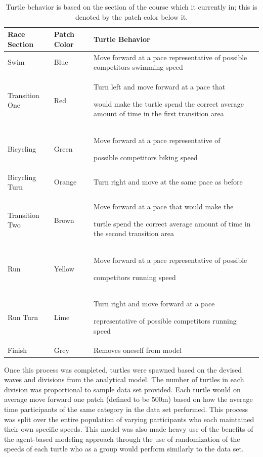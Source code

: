 \documentclass[12pt]{article}
\begin{document}
\begin{table}[H]
\centering

\label{tab:colors}
\begin{tabular}{|p{2.5cm}|p{2.5cm}|p{10cm}|}
\hline
\textbf{Race Section} & \textbf{Patch Color} & \textbf{Turtle Behavior}\\ \hline
Swim         & Blue         & Move forward at a pace representative of possible competitors swimming speed\\ \hline
Transition One    & Red         & Turn left and move forward at a pace that\par would make the turtle spend the correct average amount of time in the first transition area \\ \hline
Bicycling       & Green      & Move forward at a pace representative of \par possible competitors biking speed\\ \hline
Bicycling Turn    & Orange        & Turn right and move at the same pace as before\\ \hline
Transition Two    & Brown        & Move forward at a pace that would make the\par turtle spend the correct average amount of time in the second transition area\\ \hline
Run          & Yellow        & Move forward at a pace representative of possible\par competitors running speed\\ \hline
Run Turn       & Lime     & Turn right and move forward at a pace \par representative of possible competitors running speed\\ \hline
Finish        & Grey         & Removes oneself from model\\ \hline
\end{tabular}
\caption{Turtle behavior is based on the section of the course which it currently in; this is denoted by the patch color below it.}
\end{table}

Once this process was completed, turtles were spawned based on the devised waves and divisions from the analytical model. The number of turtles in each division was proportional to sample data set provided. Each turtle would on average move forward one patch (defined to be 500m) based on how the average time participants of the same category in the data set performed. This process was split over the entire population of varying participants who each maintained their own specific speeds. This model was also made heavy use of the benefits of the agent-based modeling approach through the use of randomization of the speeds of each turtle who as a group would perform similarly to the data set. 
\end{document}
